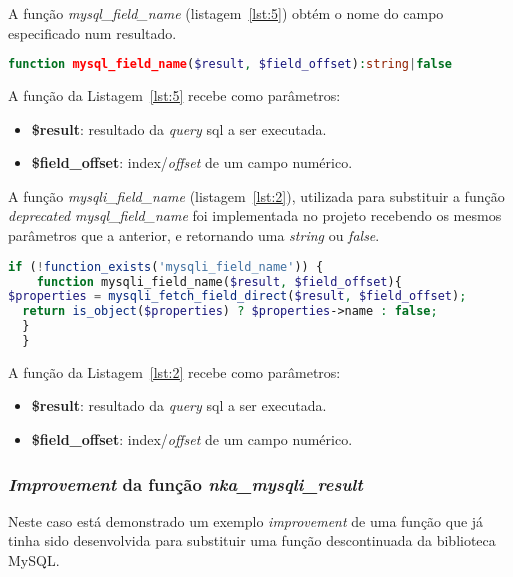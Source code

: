 A função \textit{mysql\_field\_name} (listagem~\ref{lst:5}) obtém o nome do campo especificado num resultado.


\begin{lstlisting}[language={php},
                   caption={Função mysql\_field\_name.},
                   label=lst:5]
  function mysql_field_name($result, $field_offset):string|false

\end{lstlisting}

A função da Listagem~\ref{lst:5} recebe como parâmetros:
\begin{itemize}
  \item \textbf{\$result}: resultado da \textit{query} \acrshort{sql} a ser executada.
  \item \textbf{\$field\_offset}: index/\textit{offset} de um campo numérico.
\end{itemize}


A função \textit{mysqli\_field\_name} (listagem~\ref{lst:2}), utilizada para substituir a função \textit{deprecated mysql\_field\_name} foi implementada no projeto recebendo os mesmos parâmetros que a anterior, e retornando uma \textit{string} ou \textit{false}.

\begin{lstlisting}[language={php},
                   caption={Função para substituir mysql\_field\_name.},
                   label=lst:2]
  if (!function_exists('mysqli_field_name')) {
    function mysqli_field_name($result, $field_offset){
$properties = mysqli_fetch_field_direct($result, $field_offset);
  return is_object($properties) ? $properties->name : false;
  }
  }
\end{lstlisting}

A função da Listagem~\ref{lst:2} recebe como parâmetros:
\begin{itemize}
  \item \textbf{\$result}: resultado da \textit{query} \acrshort{sql} a ser executada.
  \item \textbf{\$field\_offset}: index/\textit{offset} de um campo numérico.
\end{itemize}


\subsubsection{\textit{Improvement} da função \textit{nka\_mysqli\_result}}

Neste caso está demonstrado um exemplo \textit{improvement} de uma função que já tinha sido desenvolvida para substituir uma função descontinuada da biblioteca MySQL.

